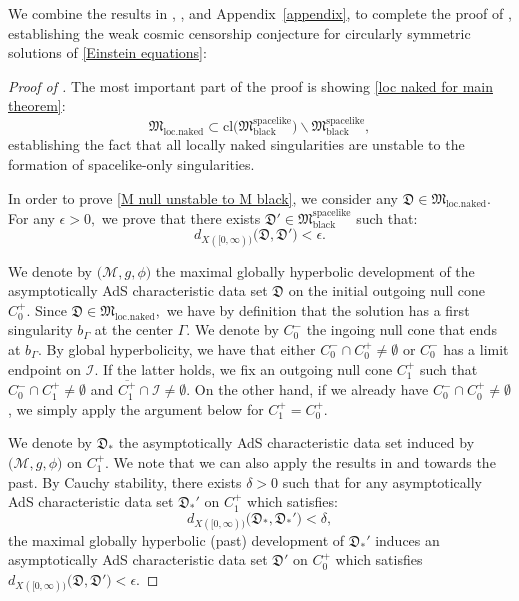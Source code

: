 \documentclass[11pt]{article}
\numberwithin{equation}{section}
\begin{document}
We combine the results in , , and Appendix~\ref{appendix}, to complete the proof of , establishing the weak cosmic censorship conjecture for circularly
symmetric solutions of \eqref{Einstein equations}:
\begin{proof}[Proof of ]

    The most important part of the proof is showing \eqref{loc naked for main theorem}:
    \begin{equation}\label{M null unstable to M black}
        \mathfrak{M}_{\mathrm{loc.naked}}\subset\mathrm{cl}\big(\mathfrak{M}_{\mathrm{black}}^{\mathrm{spacelike}}\big)\backslash\mathfrak{M}_{\mathrm{black}}^{\mathrm{spacelike}},
    \end{equation}
    establishing the fact that all locally naked singularities are unstable to the formation of spacelike-only singularities.
    

    In order to prove \eqref{M null unstable to M black}, we consider any $\mathfrak{D}\in\mathfrak{M}_{\mathrm{loc.naked}}.$ For any $\epsilon>0,$ we prove that there exists $\mathfrak{D}'\in\mathfrak{M}_{\mathrm{black}}^{\mathrm{spacelike}}$ such that:
    \begin{equation}\label{D-D' less than epsilon}
        d_{X([0,\infty))}\big(\mathfrak{D},\mathfrak{D}'\big)<\epsilon.
    \end{equation}
    
    We denote by $\big(\mathcal{M},g,\phi\big)$ the maximal globally hyperbolic development of the asymptotically AdS characteristic data set $\mathfrak{D}$ on the initial outgoing null cone $C_0^+.$ Since $\mathfrak{D}\in\mathfrak{M}_{\mathrm{loc.naked}},$ we have by definition that the solution has a first singularity $b_{\Gamma}$ at the center $\Gamma.$ We denote by $C_0^-$ the ingoing null cone that ends at $b_{\Gamma}$. By global hyperbolicity, we have that either $C_0^-\cap C_0^+\neq\emptyset$ or $C_0^-$ has a limit endpoint on $\mathcal{I}.$ If the latter holds, we fix an outgoing null cone $C_1^+$ such that $C_0^-\cap C_1^+\neq\emptyset$ and $\overline{C_1^+}\cap\mathcal{I}\neq\emptyset$. On the other hand, if we already have $C_0^-\cap C_0^+\neq\emptyset$, we simply apply the argument below for $C_1^+=C_0^+.$

    We denote by $\mathfrak{D}_*$ the asymptotically AdS characteristic data set induced by $\big(\mathcal{M},g,\phi\big)$ on $C_1^+$. We note that we can also apply the results in  and  towards the past. By Cauchy stability, there exists $\delta>0$ such that for any asymptotically AdS characteristic data set $\mathfrak{D}_*'$ on $C_1^+$ which satisfies:
    \begin{equation}\label{D1-D1' less than delta}
        d_{X([0,\infty))}\big(\mathfrak{D}_*,\mathfrak{D}_*'\big)<\delta,
    \end{equation}
    the maximal globally hyperbolic (past) development of $\mathfrak{D}_*'$ induces an asymptotically AdS characteristic data set $\mathfrak{D}'$ on $C_0^+$ which satisfies $d_{X([0,\infty))}\big(\mathfrak{D},\mathfrak{D}'\big)<\epsilon.$


\end{proof}
\end{document}
